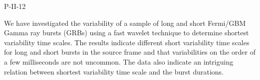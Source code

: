 P-II-12


\bigskip



\bigskip

\noindent We have investigated the variability of a sample of long and short Fermi/GBM Gamma ray bursts (GRBs) using a fast wavelet technique to determine shortest variability time scales. The results indicate different short variability time scales for long and short bursts in the source frame and that variabilities on the order of a few milliseconds are not uncommon. The data also indicate an intriguing relation between shortest variability time scale and the burst durations.
